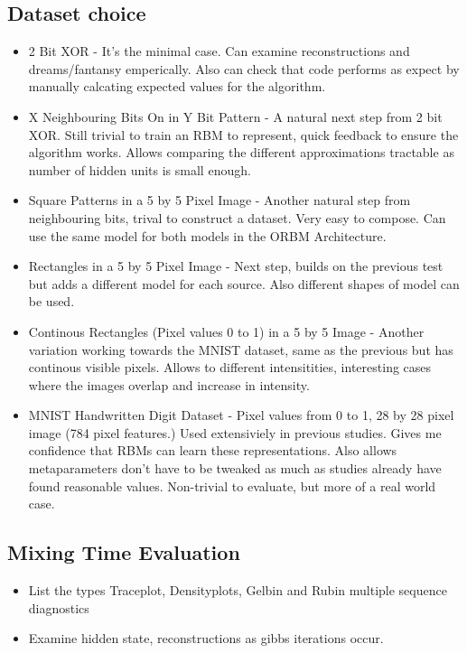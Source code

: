 \subsection{Dataset choice}
\begin{itemize}
  \item 2 Bit XOR - It's the minimal case. Can examine reconstructions and dreams/fantansy emperically. Also can check that code performs as expect by manually calcating expected values for the algorithm.
  \item X Neighbouring Bits On in Y Bit Pattern - A natural next step from 2 bit XOR. Still trivial to train an RBM to represent, quick feedback to ensure the algorithm works. Allows comparing the different approximations tractable as number of hidden units is small enough.
  \item Square Patterns in a 5 by 5 Pixel Image - Another natural step from neighbouring bits, trival to construct a dataset. Very easy to compose. Can use the same model for both models in the ORBM Architecture.
  \item Rectangles in a 5 by 5 Pixel Image - Next step, builds on the previous test but adds a different model for each source. Also different shapes of model can be used.
  \item Continous Rectangles (Pixel values 0 to 1) in a 5 by 5 Image - Another variation working towards the MNIST dataset, same as the previous but has continous visible pixels. Allows to different intensitities, interesting cases where the images overlap and increase in intensity.
  \item MNIST Handwritten Digit Dataset - Pixel values from 0 to 1, 28 by 28 pixel image (784 pixel features.) Used extensiviely in previous studies. Gives me confidence that RBMs can learn these representations. Also allows metaparameters don't have to be tweaked as much as studies already have found reasonable values. Non-trivial to evaluate, but more of a real world case.
\end{itemize}


\subsection{Mixing Time Evaluation}
  \begin{itemize}
    \item List the types Traceplot, Densityplots, Gelbin and Rubin multiple sequence diagnostics
    \item Examine hidden state, reconstructions as gibbs iterations occur.
  \end{itemize}


